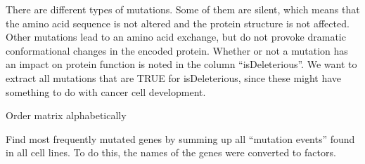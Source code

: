 \documentclass[]{article}
\newenvironment{Shaded}{\begin{snugshade}}{\end{snugshade}}
\newcommand{\CommentTok}[1]{\textcolor[rgb]{0.56,0.35,0.01}{\textit{#1}}}
\newcommand{\KeywordTok}[1]{\textcolor[rgb]{0.13,0.29,0.53}{\textbf{#1}}}
\newcommand{\NormalTok}[1]{#1}
\newcommand{\OperatorTok}[1]{\textcolor[rgb]{0.81,0.36,0.00}{\textbf{#1}}}
\newcommand{\StringTok}[1]{\textcolor[rgb]{0.31,0.60,0.02}{#1}}
\begin{document}
There are different types of mutations. Some of them are silent, which
means that the amino acid sequence is not altered and the protein
structure is not affected. Other mutations lead to an amino acid
exchange, but do not provoke dramatic conformational changes in the
encoded protein. Whether or not a mutation has an impact on protein
function is noted in the column ``isDeleterious''. We want to extract
all mutations that are TRUE for isDeleterious, since these might have
something to do with cancer cell development.

\begin{Shaded}
\end{Shaded}

Order matrix alphabetically

\begin{Shaded}
\end{Shaded}

Find most frequently mutated genes by summing up all ``mutation events''
found in all cell lines. To do this, the names of the genes were
converted to factors.

\begin{Shaded}
\end{Shaded}
\end{document}

